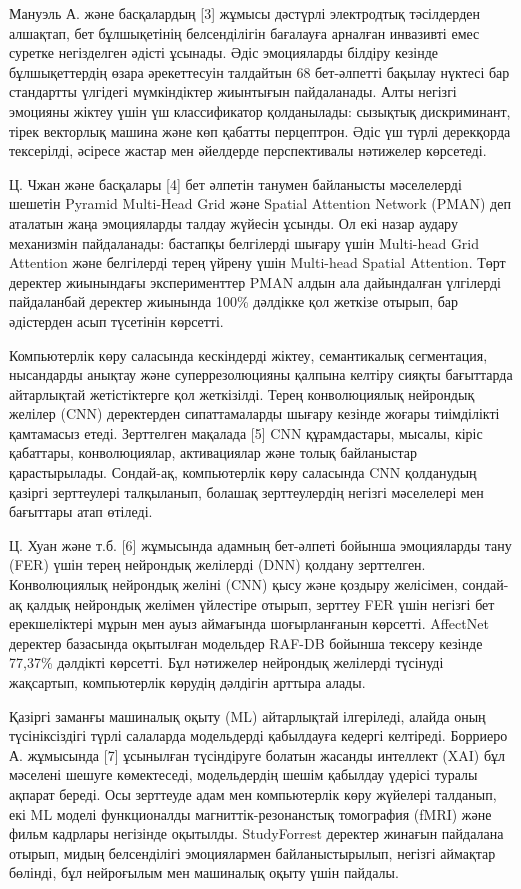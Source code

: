 \begin{multicols}{2}
Мануэль А. және басқалардың {[}3{]} жұмысы дәстүрлі электродтық
тәсілдерден алшақтап, бет бұлшықетінің белсенділігін бағалауға арналған
инвазивті емес суретке негізделген әдісті ұсынады. Әдіс эмоцияларды
білдіру кезінде бұлшықеттердің өзара әрекеттесуін талдайтын 68
бет-әлпетті бақылау нүктесі бар стандартты үлгідегі мүмкіндіктер
жиынтығын пайдаланады. Алты негізгі эмоцияны жіктеу үшін үш
классификатор қолданылады: сызықтық дискриминант, тірек векторлық машина
және көп қабатты перцептрон. Әдіс үш түрлі дерекқорда тексерілді,
әсіресе жастар мен әйелдерде перспективалы нәтижелер көрсетеді.

Ц. Чжан және басқалары {[}4{]} бет әлпетін танумен байланысты
мәселелерді шешетін Pyramid Multi-Head Grid және Spatial Attention
Network (PMAN) деп аталатын жаңа эмоцияларды талдау жүйесін ұсынды. Ол
екі назар аудару механизмін пайдаланады: бастапқы белгілерді шығару үшін
Multi-head Grid Attention және белгілерді терең үйрену үшін Multi-head
Spatial Attention. Төрт деректер жиынындағы эксперименттер PMAN алдын
ала дайындалған үлгілерді пайдаланбай деректер жиынында 100\% дәлдікке
қол жеткізе отырып, бар әдістерден асып түсетінін көрсетті.

Компьютерлік көру саласында кескіндерді жіктеу, семантикалық
сегментация, нысандарды анықтау және суперрезолюцияны қалпына келтіру
сияқты бағыттарда айтарлықтай жетістіктерге қол жеткізілді. Терең
конволюциялық нейрондық желілер (CNN) деректерден сипаттамаларды шығару
кезінде жоғары тиімділікті қамтамасыз етеді. Зерттелген мақалада {[}5{]}
CNN құрамдастары, мысалы, кіріс қабаттары, конволюциялар, активациялар
және толық байланыстар қарастырылады. Сондай-ақ, компьютерлік көру
саласында CNN қолданудың қазіргі зерттеулері талқыланып, болашақ
зерттеулердің негізгі мәселелері мен бағыттары атап өтіледі.

Ц. Хуан және т.б. {[}6{]} жұмысында адамның бет-әлпеті бойынша
эмоцияларды тану (FER) үшін терең нейрондық желілерді (DNN) қолдану
зерттелген. Конволюциялық нейрондық желіні (CNN) қысу және қоздыру
желісімен, сондай-ақ қалдық нейрондық желімен үйлестіре отырып, зерттеу
FER үшін негізгі бет ерекшеліктері мұрын мен ауыз аймағында
шоғырланғанын көрсетті. AffectNet деректер базасында оқытылған модельдер
RAF-DB бойынша тексеру кезінде 77,37\% дәлдікті көрсетті. Бұл нәтижелер
нейрондық желілерді түсінуді жақсартып, компьютерлік көрудің дәлдігін
арттыра алады.

Қазіргі заманғы машиналық оқыту (ML) айтарлықтай ілгеріледі, алайда оның
түсініксіздігі түрлі салаларда модельдерді қабылдауға кедергі келтіреді.
Борриеро А. жұмысында {[}7{]} ұсынылған түсіндіруге болатын жасанды
интеллект (XAI) бұл мәселені шешуге көмектеседі, модельдердің шешім
қабылдау үдерісі туралы ақпарат береді. Осы зерттеуде адам мен
компьютерлік көру жүйелері талданып, екі ML моделі функционалды
магниттік-резонанстық томография (fMRI) және фильм кадрлары негізінде
оқытылды. StudyForrest деректер жинағын пайдалана отырып, мидың
белсенділігі эмоциялармен байланыстырылып, негізгі аймақтар бөлінді, бұл
нейроғылым мен машиналық оқыту үшін пайдалы.


\end{multicols}
